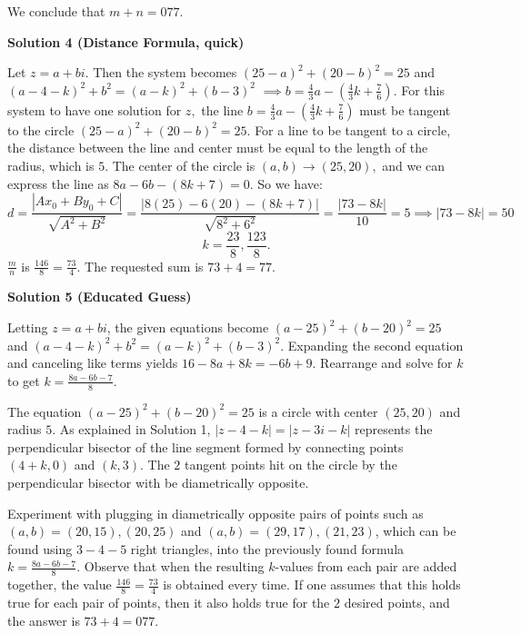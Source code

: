 \begin{enumerate}
 We conclude that $m+n=\boxed{077}$.

 



\textbf{Solution 4 (Distance Formula, quick)}

Let $z = a + bi.$ Then the system becomes $(25 - a)^2 + (20 - b)^2 = 25$ and $(a - 4 - k)^2 + b^2 = (a - k)^2 + (b - 3)^2$ $\implies b = \frac{4}{3}a - (\frac{4}{3}k + \frac{7}{6})$. For this system to have one solution for $z,$ the line $b = \frac{4}{3}a - (\frac{4}{3}k + \frac{7}{6})$ must be tangent to the circle $(25 - a)^2 + (20 - b)^2 = 25$. For a line to be tangent to a circle, the distance between the line and center must be equal to the length of the radius, which is $5$. The center of the circle is $(a,b) \rightarrow (25,20),$ and we can express the line as $8a - 6b - (8k + 7) = 0.$ So we have: 
 \[d = \frac{|Ax_0 + By_0 + C|}{\sqrt{A^2 + B^2}} = \frac{|8(25) - 6(20) -(8k + 7)|}{\sqrt{8^2 + 6^2}} =  \frac{|73 - 8k|}{10} = 5 \implies |73 - 8k| = 50\] 
 \[k = \frac{23}{8}, \frac{123}{8}.\] $\frac{m}{n}$ is $\frac{146}{8} = \frac{73}{4}.$ The requested sum is $73 + 4 = \boxed{77}.$




\textbf{Solution 5 (Educated Guess)}

Letting $z=a+bi$, the given equations become $(a-25)^2+(b-20)^2 = 25$ and $(a-4-k)^2+b^2 = (a-k)^2+(b-3)^2$. Expanding the second equation and canceling like terms yields $16-8a+8k=-6b+9$. Rearrange and solve for $k$ to get $k=\frac{8a-6b-7}{8}$.

 The equation $(a-25)^2+(b-20)^2 = 25$ is a circle with center $(25, 20)$ and radius $5$. As explained in Solution 1, $|z - 4 - k| = |z - 3i - k|$ represents the perpendicular bisector of the line segment formed by connecting points $(4+k, 0)$ and $(k, 3)$. The $2$ tangent points hit on the circle by the perpendicular bisector with be diametrically opposite.

 Experiment with plugging in diametrically opposite pairs of points such as $(a, b)={(20, 15), (20, 25)}$ and $(a, b)={(29, 17), (21, 23)}$, which can be found using $3-4-5$ right triangles, into the previously found formula $k=\frac{8a-6b-7}{8}$. Observe that when the resulting $k$-values from each pair are added together, the value $\frac{146}{8}=\frac{73}{4}$ is obtained every time. If one assumes that this holds true for each pair of points, then it also holds true for the $2$ desired points, and the answer is $73+4=\boxed{077}$.

 



\end{enumerate}
